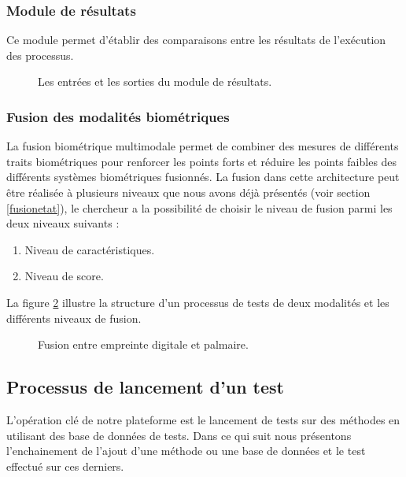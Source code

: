 \subsubsection{Module de résultats}
Ce module permet d’établir des comparaisons entre les résultats de l’exécution des processus.
\begin{figure}[H]
	\centering
	\caption{Les entrées et les sorties du module de résultats.}
	\label{resltModule}
\end{figure}
\subsubsection{Fusion des modalités biométriques}
\label{Fusion des modalités biométriques}
La fusion biométrique multimodale permet de combiner des mesures de différents traits biométriques pour renforcer les points forts et réduire les points faibles des différents systèmes biométriques fusionnés.
La fusion dans cette architecture peut être réalisée à plusieurs niveaux que nous avons déjà présentés (voir section \ref{fusionetat}), le chercheur a la possibilité de choisir le niveau de fusion parmi les deux niveaux suivants :
\begin{enumerate}
	\item Niveau de caractéristiques.
	\item Niveau de score.
\end{enumerate}
La figure \ref{cenceptionfusion} illustre la structure d'un processus de tests de deux modalités et les différents niveaux de fusion.
\begin{figure}[H]
	\centering
	\caption{Fusion entre empreinte digitale et palmaire.}
	\label{cenceptionfusion}
\end{figure}

\subsection{Processus de lancement d'un test}
L'opération clé de notre plateforme est le lancement de tests sur des méthodes en utilisant des base de données de tests. Dans ce qui suit nous présentons l’enchainement de l'ajout d'une méthode ou une base de données et le test effectué sur ces derniers.
